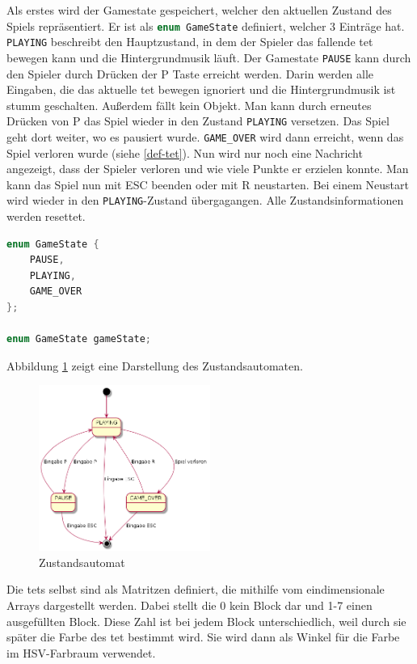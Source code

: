 \documentclass[11pt]{article}
\newcommand{\lstin}[1]{\lstinline[language=C]{#1}}
\newcommand{\refabb}[1]{Abbildung \ref{#1}}
\begin{document}
Als erstes wird der Gamestate gespeichert, welcher den aktuellen Zustand des Spiels repräsentiert.
Er ist als \lstin{enum GameState} definiert, welcher 3 Einträge hat. 
\lstin{PLAYING} beschreibt den Hauptzustand, in dem der Spieler das fallende \gls{tet} bewegen kann und die Hintergrundmusik läuft.
Der Gamestate \lstin{PAUSE} kann durch den Spieler durch Drücken der P Taste erreicht werden. 
Darin werden alle Eingaben, die das aktuelle \gls{tet} bewegen ignoriert und die Hintergrundmusik ist stumm geschalten. Außerdem fällt kein Objekt.
Man kann durch erneutes Drücken von P das Spiel wieder in den Zustand \lstin{PLAYING} versetzen. Das Spiel geht dort weiter, wo es pausiert wurde.
\lstin{GAME_OVER} wird dann erreicht, wenn das Spiel verloren wurde (siehe \ref{def-tet}). 
Nun wird nur noch eine Nachricht angezeigt, dass der Spieler verloren und wie viele Punkte er erzielen konnte. Man kann das Spiel nun mit ESC beenden oder mit R neustarten.
Bei einem Neustart wird wieder in den \lstin{PLAYING}-Zustand übergagangen. Alle Zustandsinformationen werden resettet.

\begin{lstlisting}[language=C]
enum GameState {
    PAUSE,
    PLAYING,
    GAME_OVER
};

enum GameState gameState;
\end{lstlisting}

\refabb{state} zeigt eine Darstellung des Zustandsautomaten.

\begin{figure}[h]
  \centering
  \includegraphics[width=0.5\textwidth]{../state.png}
  \caption{Zustandsautomat}
  \label{state}
\end{figure}

Die \glspl{tet} selbst sind als Matritzen definiert, die mithilfe vom eindimensionale Arrays dargestellt werden. Dabei stellt die 0 kein Block dar und 1-7 einen ausgefüllten Block.
Diese Zahl ist bei jedem Block unterschiedlich, weil durch sie später die Farbe des \gls{tet} bestimmt wird. Sie wird dann als Winkel für die Farbe im HSV-Farbraum verwendet.
\end{document}
